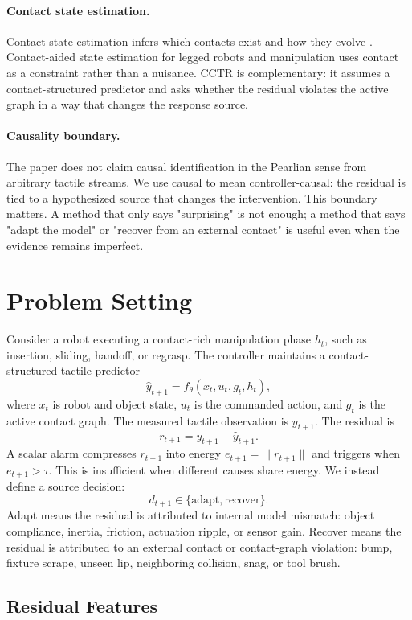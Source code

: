 \documentclass{article}
\newcommand{\method}{CCTR}
\begin{document}
\paragraph{Contact state estimation.}
Contact state estimation infers which contacts exist and how they evolve \citep{li2014control, pang2023global}. Contact-aided state estimation for legged robots and manipulation uses contact as a constraint rather than a nuisance. \method{} is complementary: it assumes a contact-structured predictor and asks whether the residual violates the active graph in a way that changes the response source.

\paragraph{Causality boundary.}
The paper does not claim causal identification in the Pearlian sense from arbitrary tactile streams. We use causal to mean controller-causal: the residual is tied to a hypothesized source that changes the intervention. This boundary matters. A method that only says "surprising" is not enough; a method that says "adapt the model" or "recover from an external contact" is useful even when the evidence remains imperfect.

\section{Problem Setting}

Consider a robot executing a contact-rich manipulation phase $h_t$, such as insertion, sliding, handoff, or regrasp. The controller maintains a contact-structured tactile predictor
\[
\hat{y}_{t+1} = f_\theta(x_t, u_t, g_t, h_t),
\]
where $x_t$ is robot and object state, $u_t$ is the commanded action, and $g_t$ is the active contact graph. The measured tactile observation is $y_{t+1}$. The residual is
\[
r_{t+1} = y_{t+1} - \hat{y}_{t+1}.
\]
A scalar alarm compresses $r_{t+1}$ into energy $e_{t+1} = \|r_{t+1}\|$ and triggers when $e_{t+1} > \tau$. This is insufficient when different causes share energy. We instead define a source decision:
\[
d_{t+1} \in \{\mathrm{adapt}, \mathrm{recover}\}.
\]
Adapt means the residual is attributed to internal model mismatch: object compliance, inertia, friction, actuation ripple, or sensor gain. Recover means the residual is attributed to an external contact or contact-graph violation: bump, fixture scrape, unseen lip, neighboring collision, snag, or tool brush.

\subsection{Residual Features}
\end{document}
